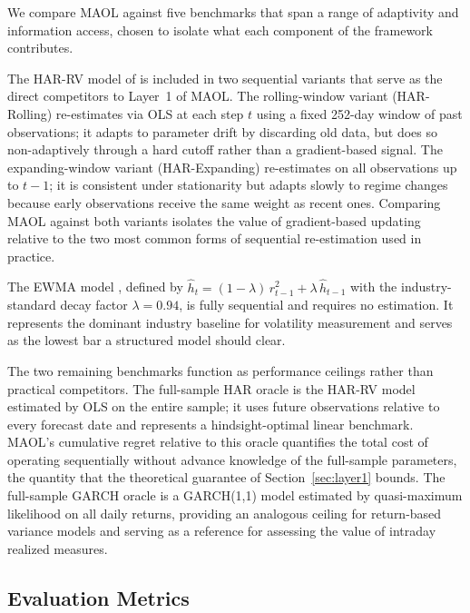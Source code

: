 We compare MAOL against five benchmarks that span a range of adaptivity and information access, chosen to isolate what each component of the framework contributes.

The HAR-RV model of \citet{corsi2009simple} is included in two sequential variants that serve as the direct competitors to Layer~1 of MAOL. The rolling-window variant (HAR-Rolling) re-estimates via OLS at each step $t$ using a fixed 252-day window of past observations; it adapts to parameter drift by discarding old data, but does so non-adaptively through a hard cutoff rather than a gradient-based signal. The expanding-window variant (HAR-Expanding) re-estimates on all observations up to $t-1$; it is consistent under stationarity but adapts slowly to regime changes because early observations receive the same weight as recent ones. Comparing MAOL against both variants isolates the value of gradient-based updating relative to the two most common forms of sequential re-estimation used in practice.

The EWMA model \citep{JPMorganRiskMetrics1996}, defined by $\hat{h}_t = (1-\lambda)\,r_{t-1}^2 + \lambda\,\hat{h}_{t-1}$ with the industry-standard decay factor $\lambda = 0.94$, is fully sequential and requires no estimation. It represents the dominant industry baseline for volatility measurement and serves as the lowest bar a structured model should clear.

The two remaining benchmarks function as performance ceilings rather than practical competitors. The full-sample HAR oracle is the HAR-RV model estimated by OLS on the entire sample; it uses future observations relative to every forecast date and represents a hindsight-optimal linear benchmark. MAOL's cumulative regret relative to this oracle quantifies the total cost of operating sequentially without advance knowledge of the full-sample parameters, the quantity that the theoretical guarantee of Section~\ref{sec:layer1} bounds. The full-sample GARCH oracle is a GARCH(1,1) model estimated by quasi-maximum likelihood on all daily returns, providing an analogous ceiling for return-based variance models and serving as a reference for assessing the value of intraday realized measures.

\subsection{Evaluation Metrics}\label{sec:metrics}

